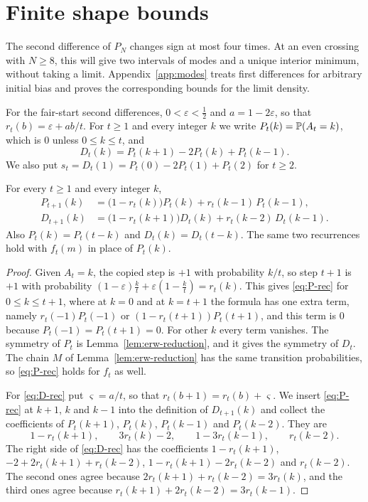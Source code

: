 \section{Finite shape bounds}\label{sec:convex}

The second difference of $P_N$ changes sign at most four times.
At an even crossing with $N\ge8$, this will give two intervals of modes
and a unique interior minimum, without taking a limit.
Appendix~\ref{app:modes} treats first differences for arbitrary initial
bias and proves the corresponding bounds for the limit density.

For the fair-start second differences, $0<\varepsilon<\frac12$ and $a=1-2\varepsilon$, so
that $r_t(b)=\varepsilon+ab/t$. For $t\ge1$ and every integer $k$ we write
$P_t(k)=\mathbb{P}(A_t=k)$, which is $0$ unless $0\le k\le t$, and
\[
 D_t(k)=P_t(k+1)-2P_t(k)+P_t(k-1).
\]
We also put $s_t=D_t(1)=P_t(0)-2P_t(1)+P_t(2)$ for $t\ge2$.

\begin{lemma}\label{lem:D-rec}
For every $t\ge1$ and every integer $k$,
\begin{align}
 P_{t+1}(k)&=\bigl(1-r_t(k)\bigr)P_t(k)+r_t(k-1)\,P_t(k-1),\label{eq:P-rec}\\
 D_{t+1}(k)&=\bigl(1-r_t(k+1)\bigr)D_t(k)+r_t(k-2)\,D_t(k-1).\label{eq:D-rec}
\end{align}
Also $P_t(k)=P_t(t-k)$ and $D_t(k)=D_t(t-k)$. The same two recurrences hold
with $f_t(m)$ in place of $P_t(k)$.
\end{lemma}

\begin{proof}
Given $A_t=k$, the copied step is $+1$ with probability $k/t$, so step $t+1$
is $+1$ with probability $(1-\varepsilon)\frac kt+\varepsilon(1-\frac
kt)=r_t(k)$. This gives \eqref{eq:P-rec} for $0\le k\le t+1$, where at $k=0$ and at
$k=t+1$ the formula has one extra term, namely $r_t(-1)P_t(-1)$ or
$(1-r_t(t+1))P_t(t+1)$, and this term is $0$ because $P_t(-1)=P_t(t+1)=0$. For
other $k$ every term vanishes. The
symmetry of $P_t$ is Lemma~\ref{lem:erw-reduction}, and it gives the symmetry
of $D_t$. The chain $M$ of Lemma~\ref{lem:erw-reduction} has the same
transition probabilities, so \eqref{eq:P-rec} holds for $f_t$ as well.

For \eqref{eq:D-rec} put $\varsigma=a/t$, so that $r_t(b+1)=r_t(b)+\varsigma$.
We insert \eqref{eq:P-rec} at $k+1$, $k$ and $k-1$ into the definition of
$D_{t+1}(k)$ and collect the coefficients of $P_t(k+1)$, $P_t(k)$, $P_t(k-1)$
and $P_t(k-2)$. They are
\[
 1-r_t(k+1),\qquad 3r_t(k)-2,\qquad 1-3r_t(k-1),\qquad r_t(k-2).
\]
The right side of \eqref{eq:D-rec} has the coefficients $1-r_t(k+1)$,
$-2+2r_t(k+1)+r_t(k-2)$, $1-r_t(k+1)-2r_t(k-2)$ and $r_t(k-2)$. The second
ones agree because $2r_t(k+1)+r_t(k-2)=3r_t(k)$, and the third ones agree
because $r_t(k+1)+2r_t(k-2)=3r_t(k-1)$.
\end{proof}

